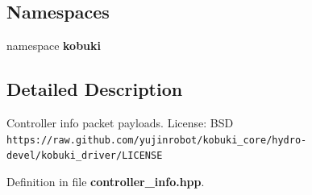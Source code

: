 \subsection*{\-Namespaces}
\begin{DoxyCompactItemize}
\item 
namespace {\bf kobuki}
\end{DoxyCompactItemize}


\subsection{\-Detailed \-Description}
\-Controller info packet payloads. \-License\-: \-B\-S\-D {\tt https\-://raw.\-github.\-com/yujinrobot/kobuki\-\_\-core/hydro-\/devel/kobuki\-\_\-driver/\-L\-I\-C\-E\-N\-S\-E} 

\-Definition in file {\bf controller\-\_\-info.\-hpp}.

